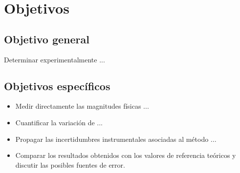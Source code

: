 
\section{Objetivos}
\label{sec:objetivos}

\subsection{Objetivo general}

Determinar experimentalmente ...

\subsection{Objetivos específicos}

\begin{itemize}
    \item Medir directamente las magnitudes físicas ...
    \item Cuantificar la variación de ...
    \item Propagar las incertidumbres instrumentales asociadas al método ...
    \item Comparar los resultados obtenidos con los valores de referencia teóricos y discutir las posibles fuentes de error.
\end{itemize}

